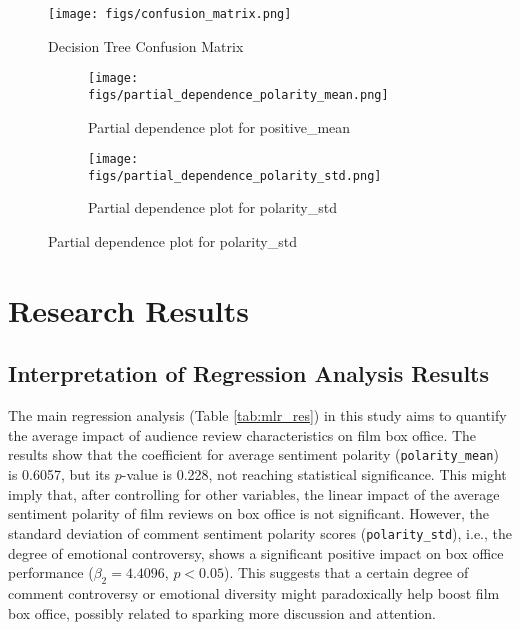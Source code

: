 \documentclass{article}
\begin{document}
\begin{figure}[H]
\centering
\texttt{[image: figs/confusion\_matrix.png]} %
\caption{Decision Tree Confusion Matrix}
\label{fig:rf_cm}
\end{figure}

\begin{figure}[htbp]
\centering
\caption{Partial Dependence Plots for Key Variables}
\label{fig:pd_all}
\begin{subfigure}[b]{0.48\textwidth}
\centering
\texttt{[image: figs/partial\_dependence\_polarity\_mean.png]}
\caption{Partial dependence plot for positive\_mean}
\label{fig:pd_polarity_mean}
\end{subfigure}
\begin{subfigure}[b]{0.48\textwidth}
\centering
\texttt{[image: figs/partial\_dependence\_polarity\_std.png]}
\caption{Partial dependence plot for polarity\_std}
\label{fig:pd_polarity_std}
\end{subfigure}
\end{figure}

\section{Research Results}

\subsection{Interpretation of Regression Analysis Results}
The main regression analysis (Table \ref{tab:mlr_res}) in this study aims to quantify the average impact of audience review characteristics on film box office. The results show that the coefficient for average sentiment polarity (\texttt{polarity\_mean}) is 0.6057, but its \(p\)-value is 0.228, not reaching statistical significance. This might imply that, after controlling for other variables, the linear impact of the average sentiment polarity of film reviews on box office is not significant. However, the standard deviation of comment sentiment polarity scores (\texttt{polarity\_std}), i.e., the degree of emotional controversy, shows a significant positive impact on box office performance ($\beta_2 = 4.4096$, \(p < 0.05\)). This suggests that a certain degree of comment controversy or emotional diversity might paradoxically help boost film box office, possibly related to sparking more discussion and attention.
\end{document}

